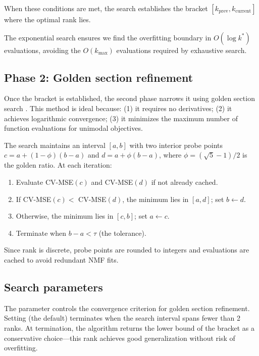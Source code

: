 \documentclass[article]{jss_modified}
\begin{document}
When these conditions are met, the search establishes the bracket 
$[k_{\text{prev}}, k_{\text{current}}]$ where the optimal rank lies.

The exponential search ensures we find the overfitting boundary in 
$O(\log k^*)$ evaluations, avoiding the $O(k_{\max})$ evaluations required by 
exhaustive search.

\subsection{Phase 2: Golden section refinement}

Once the bracket is established, the second phase narrows it using golden 
section search \citep{Kiefer1953}. This method is ideal because: (1) it requires 
no derivatives; (2) it achieves logarithmic convergence; (3) it minimizes the 
maximum number of function evaluations for unimodal objectives.

The search maintains an interval $[a, b]$ with two interior probe points 
$c = a + (1-\phi)(b-a)$ and $d = a + \phi(b-a)$, where $\phi = (\sqrt{5}-1)/2$ 
is the golden ratio. At each iteration:

\begin{enumerate}
  \item Evaluate CV-MSE$(c)$ and CV-MSE$(d)$ if not already cached.
  \item If CV-MSE$(c) <$ CV-MSE$(d)$, the minimum lies in $[a, d]$; set 
  $b \leftarrow d$.
  \item Otherwise, the minimum lies in $[c, b]$; set $a \leftarrow c$.
  \item Terminate when $b - a < \tau$ (the tolerance).
\end{enumerate}

Since rank is discrete, probe points are rounded to integers and evaluations 
are cached to avoid redundant NMF fits.

\subsection{Search parameters}

The  parameter controls the convergence criterion for golden 
section refinement. Setting  (the default) terminates 
when the search interval spans fewer than 2 ranks. At termination, the algorithm 
returns the lower bound of the bracket as a conservative choice---this rank 
achieves good generalization without risk of overfitting.
\end{document}
